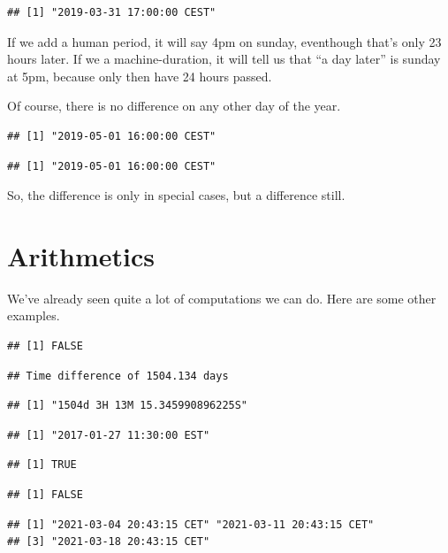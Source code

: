 \documentclass[]{tufte-book}
\begin{document}
\begin{verbatim}
## [1] "2019-03-31 17:00:00 CEST"
\end{verbatim}

If we add a human period, it will say 4pm on sunday, eventhough that's only 23 hours later. If we a machine-duration, it will tell us that ``a day later'' is sunday at 5pm, because only then have 24 hours passed.

Of course, there is no difference on any other day of the year.

\begin{verbatim}
## [1] "2019-05-01 16:00:00 CEST"
\end{verbatim}

\begin{verbatim}
## [1] "2019-05-01 16:00:00 CEST"
\end{verbatim}

So, the difference is only in special cases, but a difference still.

\hypertarget{arithmetics}{%
\section{Arithmetics}\label{arithmetics}}

We've already seen quite a lot of computations we can do. Here are some other examples.

\begin{verbatim}
## [1] FALSE
\end{verbatim}

\begin{verbatim}
## Time difference of 1504.134 days
\end{verbatim}

\begin{verbatim}
## [1] "1504d 3H 13M 15.345990896225S"
\end{verbatim}

\begin{verbatim}
## [1] "2017-01-27 11:30:00 EST"
\end{verbatim}

\begin{verbatim}
## [1] TRUE
\end{verbatim}

\begin{verbatim}
## [1] FALSE
\end{verbatim}

\begin{verbatim}
## [1] "2021-03-04 20:43:15 CET" "2021-03-11 20:43:15 CET"
## [3] "2021-03-18 20:43:15 CET"
\end{verbatim}
\end{document}
